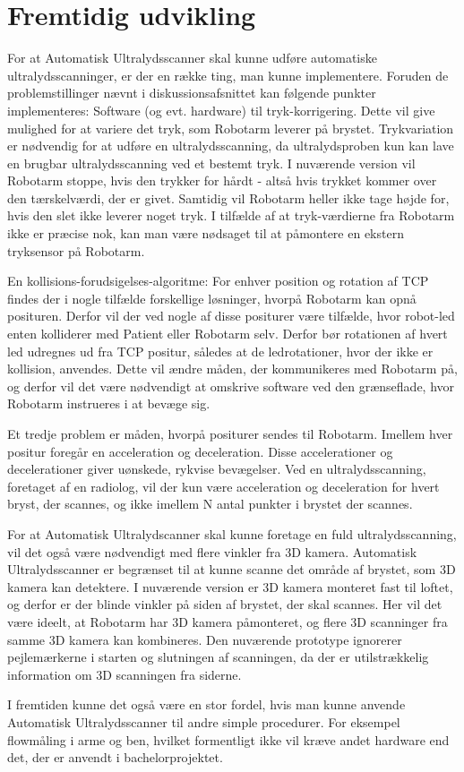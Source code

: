 \chapter{Fremtidig udvikling}\label{kapitel_Fremtidig udvikling}
For at Automatisk Ultralydsscanner skal kunne udføre automatiske ultralydsscanninger, er der en række ting, man kunne implementere. Foruden de problemstillinger nævnt i diskussionsafsnittet kan følgende punkter implementeres:
Software (og evt. hardware) til tryk-korrigering. Dette vil give mulighed for at variere det tryk, som Robotarm leverer på brystet. Trykvariation er nødvendig for at udføre en ultralydsscanning, da ultralydsproben kun kan lave en brugbar ultralydsscanning ved et bestemt tryk. I nuværende version vil Robotarm stoppe, hvis den trykker for hårdt - altså hvis trykket kommer over den tærskelværdi, der er givet. Samtidig vil Robotarm heller ikke tage højde for, hvis den slet ikke leverer noget tryk. I tilfælde af at tryk-værdierne fra Robotarm ikke er præcise nok, kan man være nødsaget til at påmontere en ekstern tryksensor på Robotarm.

En kollisions-forudsigelses-algoritme: For enhver position og rotation af TCP findes der i nogle tilfælde forskellige løsninger, hvorpå Robotarm kan opnå posituren. Derfor vil der ved nogle af disse positurer være tilfælde, hvor robot-led enten kolliderer med Patient eller Robotarm selv. Derfor bør rotationen af hvert led udregnes ud fra TCP positur, således at de ledrotationer, hvor der ikke er kollision, anvendes. Dette vil ændre måden, der kommunikeres med Robotarm på, og derfor vil det være nødvendigt at omskrive software ved den grænseflade, hvor Robotarm instrueres i at bevæge sig.

Et tredje problem er måden, hvorpå positurer sendes til Robotarm. Imellem hver positur foregår en acceleration og deceleration. Disse accelerationer og decelerationer giver uønskede, rykvise bevægelser. Ved en ultralydsscanning, foretaget af en radiolog, vil der kun være acceleration og deceleration for hvert bryst, der scannes, og ikke imellem N antal punkter i brystet der scannes.

For at Automatisk Ultralydscanner skal kunne foretage en fuld ultralydsscanning, vil det også være nødvendigt med flere vinkler fra 3D kamera. Automatisk Ultralydsscanner er begrænset til at kunne scanne det område af brystet, som 3D kamera kan detektere. I nuværende version er 3D kamera monteret fast til loftet, og derfor er der blinde vinkler på siden af brystet, der skal scannes. Her vil det være ideelt, at Robotarm har 3D kamera påmonteret, og flere 3D scanninger fra samme 3D kamera kan kombineres. Den nuværende prototype ignorerer pejlemærkerne i starten og slutningen af scanningen, da der er utilstrækkelig information om 3D scanningen fra siderne.

I fremtiden kunne det også være en stor fordel, hvis man kunne anvende Automatisk Ultralydsscanner til andre simple procedurer. For eksempel flowmåling i arme og ben, hvilket formentligt ikke vil kræve andet hardware end det, der er anvendt i bachelorprojektet.